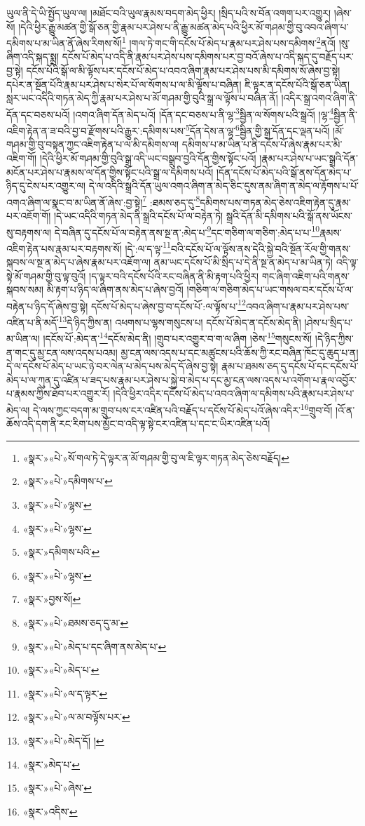 ཡུལ་ནི་དེ་ཡི་སྤྱོད་ཡུལ་ལ། །མཐོང་བའི་ཡུལ་རྣམས་བདག་མེད་ཕྱིར། །སྲིད་པའི་ས་བོན་འགག་པར་འགྱུར། །ཞེས་སོ། །དེའི་ཕྱིར་རྒྱུ་མཚན་གྱི་སྒོ་ཅན་གྱི་རྣམ་པར་ཤེས་པ་ནི་རྒྱུ་མཚན་མེད་པའི་ཕྱིར་མོ་གཤམ་གྱི་བུ་འབའ་ཞིག་པ་དམིགས་པ་མ་ཡིན་ནོ་ཞེས་རིགས་སོ།\footnote{«སྣར་»«པེ་»སོ་གལ་ཏེ་དེ་ལྟར་ན་མོ་གཤམ་གྱི་བུ་ལ་ཇི་ལྟར་གཏན་མེད་ཅེས་བརྗོད།} །གལ་ཏེ་གང་གི་དངོས་པོ་མེད་པ་རྣམ་པར་ཤེས་པས་དམིགས་\footnote{«སྣར་»«པེ་»དམིགས་པ་}ནའོ། །སུ་ཞིག་འདི་སྐད་སྨྲ། དངོས་པོ་མེད་པ་འདི་ནི་རྣམ་པར་ཤེས་པས་དམིགས་པར་བྱ་བའོ་ཞེས་པ་འདི་སྐད་དུ་བརྗོད་པར་བྱ་སྟེ། དངོས་པོའི་སྒོ་ལ་མི་ལྟོས་པར་དངོས་པོ་མེད་པ་འབའ་ཞིག་རྣམ་པར་ཤེས་པས་མི་དམིགས་སོ་ཞེས་བྱ་སྟེ། དཔེར་ན་སྔོན་པོའི་རྣམ་པར་ཤེས་པ་སེར་པོ་ལ་སོགས་པ་ལ་མི་ལྟོས་པ་བཞིན། ཇི་ལྟར་ན་དངོས་པོའི་སྒོ་ཅན་ཡིན། སླར་ཡང་འདིའི་གཏན་མེད་ཀྱི་རྣམ་པར་ཤེས་པ་མོ་གཤམ་གྱི་བུའི་སྒྲ་ལ་ལྟོས་པ་བཞིན་ནོ། །འདིར་སྒྲ་འགའ་ཞིག་ནི་དོན་དང་བཅས་པའོ། །འགའ་ཞིག་དོན་མེད་པའོ། །དོན་དང་བཅས་པ་ནི་ལྷ་\footnote{«སྣར་»«པེ་»ལྷས་}སྦྱིན་ལ་སོགས་པའི་སྒྲའོ། །ལྷ་\footnote{«སྣར་»«པེ་»ལྷས་}སྦྱིན་ནི་འཇིག་རྟེན་ན་ཟ་བའི་བྱ་བ་རྫོགས་པའི་རྒྱུར་:དམིགས་པས་\footnote{«སྣར་»དམིགས་པའི་}དོན་དེས་ན་ལྷ་\footnote{«སྣར་»«པེ་»ལྷས་}སྦྱིན་གྱི་སྒྲ་དོན་དང་ལྡན་པའོ། །མོ་གཤམ་གྱི་བུ་བསྟན་ཀྱང་འཇིག་རྟེན་པ་ལ་མི་དམིགས་ལ། དམིགས་པ་མ་ཡིན་པ་ནི་དངོས་པོ་ཞེས་རྣམ་པར་མི་འཇིག་གོ། །དེའི་ཕྱིར་མོ་གཤམ་གྱི་བུའི་སྒྲ་འདི་ཡང་བསྒྲུབ་བྱའི་དོན་གྱིས་སྟོང་པའོ། །རྣམ་པར་ཤེས་པ་ཡང་སྒྲའི་དོན་མངོན་པར་ཤེས་པ་རྣམས་ལ་དོན་གྱིས་སྟོང་པའི་སྒྲ་ལ་དམིགས་པའོ། །དོན་དངོས་པོ་མེད་པའི་སྒོ་ནས་དོན་མེད་པ་ཉིད་དུ་ངེས་པར་འགྱུར་ལ། དེ་ལ་འདིའི་སྒྲའི་དོན་ཡུལ་འགའ་ཞིག་ན་མེད་ཅིང་དུས་ནམ་ཞིག་ན་མེད་ལ་རྟོགས་པ་པོ་འགའ་ཞིག་ལ་སྣང་བ་མ་ཡིན་ནོ་ཞེས་:བྱ་སྟེ།\footnote{«སྣར་»བྱས་སོ།} :ཐམས་ཅད་དུ་\footnote{«སྣར་»«པེ་»ཐམས་ཅད་དུ་མ་}དམིགས་པས་གཏན་མེད་ཅེས་འཇིག་རྟེན་དུ་རྣམ་པར་འཇོག་གོ། །དེ་ཡང་འདིའི་གཏན་མེད་ནི་སྒྲའི་དངོས་པོ་ལ་བརྟེན་ཏེ། སྒྲའི་དོན་མི་དམིགས་པའི་སྒོ་ནས་ཡོངས་སུ་བརྟགས་ལ། དེ་བཞིན་དུ་དངོས་པོ་ལ་བརྟེན་ནས་སྔ་ན་:མེད་པ་\footnote{«སྣར་»«པེ་»མེད་པ་དང་ཞིག་ནས་མེད་པ་}དང་གཅིག་ལ་གཅིག་:མེད་པ་པ་\footnote{«སྣར་»«པེ་»མེད་པ་}རྣམས་འཇིག་རྟེན་པས་རྣམ་པར་བརྟགས་སོ། །དེ་:ལ་ད་ལྟ་\footnote{«སྣར་»«པེ་»ལ་ད་ལྟར་}བའི་དངོས་པོ་ལ་ལྟོས་ནས་དེའི་སྐྱེ་བའི་སྔོན་རོལ་གྱི་གནས་སྐབས་ལ་སྔ་ན་མེད་པ་ཞེས་རྣམ་པར་འཇོག་ལ། ནམ་ཡང་དངོས་པོ་མི་སྲིད་པ་དེ་ནི་སྔ་ན་མེད་པ་མ་ཡིན་ཏེ། འདི་ལྟ་སྟེ་མོ་གཤམ་གྱི་བུ་ལྟ་བུའོ། །ད་ལྟར་བའི་དངོས་པོའི་རང་བཞིན་ནི་མི་རྟག་པའི་ཕྱིར། གང་ཞིག་འཇིག་པའི་གནས་སྐབས་སམ། མི་རྟག་པ་ཉིད་ལ་ཞིག་ནས་མེད་པ་ཞེས་བྱའོ། །གཅིག་ལ་གཅིག་མེད་པ་ཡང་གསལ་བར་དངོས་པོ་ལ་བརྟེན་པ་ཉིད་དོ་ཞེས་བྱ་སྟེ། དངོས་པོ་མེད་པ་ཞེས་བྱ་བ་དངོས་པོ་:ལ་ལྟོས་པ་\footnote{«སྣར་»«པེ་»ལ་མ་བལྟོས་པར་}འབའ་ཞིག་པ་རྣམ་པར་ཤེས་པས་འཛིན་པ་ནི་མདོ་\footnote{«སྣར་»«པེ་»མེད་དོ། །}དེ་ཉིད་ཀྱིས་ན། འཕགས་པ་ལྷས་གསུངས་པ། དངོས་པོ་མེད་ན་དངོས་མེད་ནི། །ཤེས་པ་སྲིད་པ་མ་ཡིན་ལ། །དངོས་པོ་:མེད་ན་\footnote{«སྣར་»མེད་པ་}དངོས་མེད་ནི། །གྲུབ་པར་འགྱུར་བ་ག་ལ་ཞིག །ཅེས་\footnote{«སྣར་»«པེ་»ཞེས་}གསུངས་སོ། །དེ་ཉིད་ཀྱིས་ན་གང་དུ་མྱ་ངན་ལས་འདས་པའམ། མྱ་ངན་ལས་འདས་པ་དང་མཚུངས་པའི་ཆོས་ཀྱི་རང་བཞིན་ཁོང་དུ་ཆུད་པ་ན། དེ་ལ་དངོས་པོ་མེད་པ་ཡང་ཉེ་བར་ལེན་པ་མེད་པས་མེད་དོ་ཞེས་བྱ་སྟེ། རྣམ་པ་ཐམས་ཅད་དུ་དངོས་པོ་དང་དངོས་པོ་མེད་པ་ལ་ཀུན་དུ་འཛིན་པ་ཟད་པས་རྣམ་པར་ཤེས་པ་སྐྱེ་བ་མེད་པ་དང་མྱ་ངན་ལས་འདས་པ་འགོག་པ་རྣལ་འབྱོར་པ་རྣམས་ཀྱིས་ཐོབ་པར་འགྱུར་རོ། །དེའི་ཕྱིར་འདིར་དངོས་པོ་མེད་པ་འབའ་ཞིག་ལ་དམིགས་པའི་རྣམ་པར་ཤེས་པ་མེད་ལ། དེ་ལས་ཀྱང་བདག་མ་གྲུབ་པས་ངར་འཛིན་པའི་བརྗོད་པ་དངོས་པོ་མེད་པའོ་ཞེས་འདིར་\footnote{«སྣར་»འདིས་}གྲུབ་བོ། །འོ་ན་ཆོས་འདི་དག་ནི་རང་རིག་པས་མྱོང་བ་འདི་ལྟ་སྟེ་ངར་འཛིན་པ་དང་ང་ཡིར་འཛིན་པའོ། 